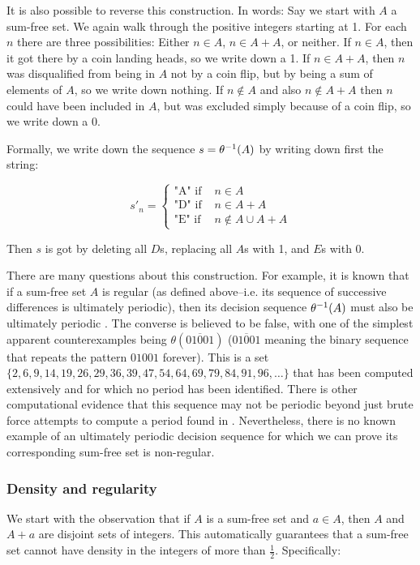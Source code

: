 \documentclass{article}
\theoremstyle{definition}
\theoremstyle{remark}
\numberwithin{equation}{section}
\begin{document}
It is also possible to reverse this construction.  In words: Say we
start with $A$ a sum-free set.  We again walk through the positive
integers starting at 1.  For each $n$ there are three possibilities:
Either $n \in A$, $n \in A+A$, or neither.  If $n \in A$, then it got
there by a coin landing heads, so we write down a 1.  If $n \in A+A$,
then $n$ was disqualified from being in $A$ not by a coin flip, but by
being a sum of elements of $A$, so we write down nothing.  If $n
\notin A$ and also $n \notin A+A$ then $n$ could have been included in
$A$, but was excluded simply because of a coin flip, so we write down
a 0.  

Formally, we write down the sequence $s = \theta^{-1}(A)$ by writing
down first the string: 

\[s'_n = \begin{cases}
\text{"A" if }& n \in A\\
\text{"D" if }& n \in A+A\\
\text{"E" if }& n \notin A \cup A+A
\end{cases}\]

Then $s$ is got by deleting all $D$s, replacing all $A$s with 1, and
$E$s with 0.  

There are many questions about this construction.  For example, it is
known that if a sum-free set $A$ is regular (as defined
above--i.e. its sequence of successive differences is ultimately
periodic), then its decision sequence $\theta^{-1}(A)$ must also be
ultimately periodic \cite{sumfree_cameron}.  The converse is believed
to be false, with one of the simplest apparent counterexamples being
$\theta(\overline{01001})$ ($\overline{01001}$ meaning the binary
sequence that repeats the pattern $01001$ forever).  This is a set
$\{2, 6, 9, 14, 19, 26, 29, 36, 39, 47, 54, 64, 69, 79, 84, 91, 96,
\ldots\}$ that has been computed extensively and for which no period
has been identified.  There is other computational evidence that this
sequence may not be periodic beyond just brute force attempts to
compute a period found in \cite{difference_density_calkin}.
Nevertheless, there is no known example of an ultimately periodic
decision sequence for which we can prove its corresponding sum-free
set is non-regular.

\subsubsection{Density and regularity}

We start with the observation that if $A$ is a sum-free set and
$a \in A$, then $A$ and $A+a$ are disjoint sets of integers.  This
automatically guarantees that a sum-free set cannot have density in
the integers of more than $\frac12$.  Specifically: 
\end{document}

